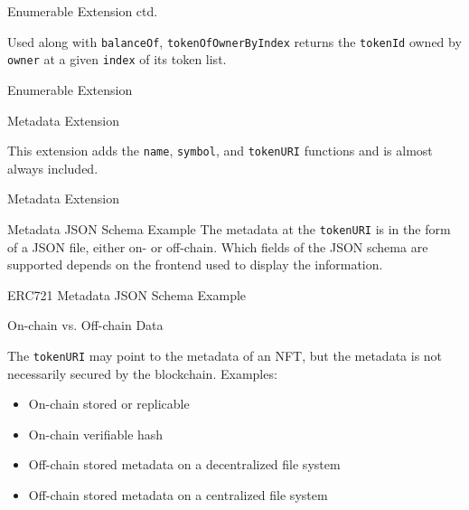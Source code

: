 \documentclass[handout]{beamer}
\begin{document}
\begin{frame}{Enumerable Extension ctd.}

Used along with \texttt{balanceOf}, \texttt{tokenOfOwnerByIndex} returns the \texttt{tokenId} owned by \texttt{owner} at a given \texttt{index} of its token list.
\vspace{0.5em}
	\begin{samplecode}{Enumerable Extension}
		
	\end{samplecode}
\end{frame}

\begin{frame}{Metadata Extension}

This extension adds the \texttt{name}, \texttt{symbol}, and \texttt{tokenURI} functions and is almost always included.
\vspace{0.5em}
	\begin{samplecode}{Metadata Extension}
		
	\end{samplecode}
\end{frame}

\begin{frame}{Metadata JSON Schema Example}
The metadata at the \texttt{tokenURI} is in the form of a JSON file, either on- or off-chain. Which fields of the JSON schema are supported depends on the frontend used to display the information.
\vspace{0.5em}
\begin{samplecode}{ERC721 Metadata JSON Schema Example}
	
\end{samplecode}
\end{frame}

\begin{frame}{On-chain vs. Off-chain Data}

The \texttt{tokenURI} may point to the metadata of an NFT, but the metadata is not necessarily secured by the blockchain. Examples:\\
	\begin{itemize}
		\item<2-> On-chain stored or replicable
		\item<3-> On-chain verifiable hash
		\item<4-> Off-chain stored metadata on a decentralized file system
		\item<5-> Off-chain stored metadata on a centralized file system
	\end{itemize}
\end{frame}
\end{document}

